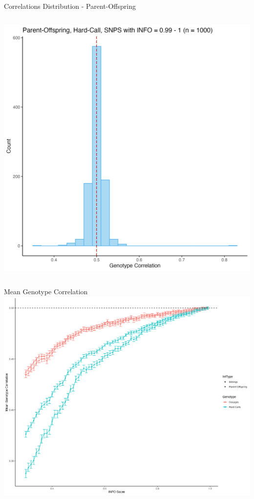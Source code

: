 \documentclass{beamer}
\begin{document}
\begin{frame}{Correlations Distribution - Parent-Offspring}
\begin{columns}
\begin{column}{0.5\textwidth}
                \includegraphics[width= \textwidth]{fig/PO-HC-i99.png}
            \end{column}
        \end{columns}       
\end{frame}

\begin{frame}{Mean Genotype Correlation}
      \centering
      \includegraphics[width=.83\textwidth]{fig/mean_gt_corr_v2.png}
\end{frame}
\end{document}
